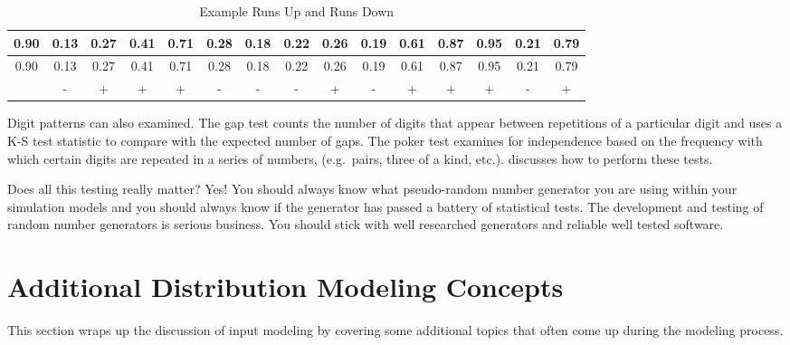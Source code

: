 \documentclass[
]{book}
\theoremstyle{definition}
\theoremstyle{definition}
\theoremstyle{definition}
\theoremstyle{definition}
\theoremstyle{remark}
\begin{document}
\hypertarget{tab:RunsTest}{}
\begin{longtable}[]{@{}ccccccccccccccc@{}}
\caption{\label{tab:RunsTest} Example Runs Up and Runs Down}\tabularnewline
\toprule
0.90 & 0.13 & 0.27 & 0.41 & 0.71 & 0.28 & 0.18 & 0.22 & 0.26 & 0.19 & 0.61 & 0.87 & 0.95 & 0.21 & 0.79 \\
\midrule
\endfirsthead
\toprule
0.90 & 0.13 & 0.27 & 0.41 & 0.71 & 0.28 & 0.18 & 0.22 & 0.26 & 0.19 & 0.61 & 0.87 & 0.95 & 0.21 & 0.79 \\
\midrule
\endhead
& - & + & + & + & - & - & - & + & - & + & + & + & - & + \\
\bottomrule
\end{longtable}

Digit patterns can also examined. The gap test counts the number of
digits that appear between repetitions of a particular digit and uses a
K-S test statistic to compare with the expected number of gaps. The
poker test examines for independence based on the frequency with which
certain digits are repeated in a series of numbers, (e.g.~pairs, three
of a kind, etc.). \citet{banks2005discreteevent} discusses how to perform these
tests.

Does all this testing really matter? Yes! You should always know what pseudo-random number
generator you are using within your simulation models and you should always know if the generator has passed a battery of statistical tests. The
development and testing of random number generators is serious business.
You should stick with well researched generators and reliable well
tested software.

\hypertarget{app:distfit:idms2sb4}{%
\section{Additional Distribution Modeling Concepts}\label{app:distfit:idms2sb4}}

This section wraps up the discussion of input modeling by covering some
additional topics that often come up during the modeling process.
\end{document}

